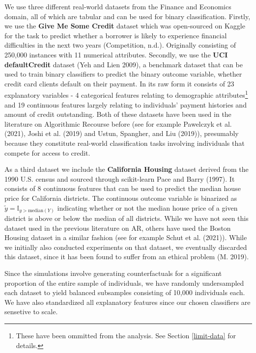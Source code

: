 \documentclass[conference,final,]{IEEEtran}
\begin{document}
We use three different real-world datasets from the Finance and Economics domain, all of which are tabular and can be used for binary classification. Firstly, we use the \textbf{Give Me Some Credit} dataset which was open-sourced on Kaggle for the task to predict whether a borrower is likely to experience financial difficulties in the next two years (Competition, n.d.). Originally consisting of 250,000 instances with 11 numerical attributes. Secondly, we use the \textbf{UCI defaultCredit} dataset (Yeh and Lien 2009), a benchmark dataset that can be used to train binary classifiers to predict the binary outcome variable, whether credit card clients default on their payment. In its raw form it consists of 23 explanatory variables - 4 categorical features relating to demographic attributes\footnote{These have been ommitted from the analysis. See Section \ref{limit-data} for details.} and 19 continuous features largely relating to individuals' payment histories and amount of credit outstanding. Both of these datasets have been used in the literature on Algorithmic Recourse before (see for example Pawelczyk et al. (2021), Joshi et al. (2019) and Ustun, Spangher, and Liu (2019)), presumably because they constitute real-world classification tasks involving individuals that compete for access to credit.

As a third dataset we include the \textbf{California Housing} dataset derived from the 1990 U.S. census and sourced through scikit-learn Pace and Barry (1997). It consists of 8 continuous features that can be used to predict the median house price for California districts. The continuous outcome variable is binarized as \(\tilde{y}=\mathbb{I}_{y>\text{median}(Y)}\) indicating whether or not the median house price of a given district is above or below the median of all districts. While we have not seen this dataset used in the previous literature on AR, others have used the Boston Housing dataset in a similar fashion (see for example Schut et al. (2021)). While we initially also conducted experiments on that dataset, we eventually discarded this dataset, since it has been found to suffer from an ethical problem (M. 2019).

Since the simulations involve generating counterfactuals for a significant proportion of the entire sample of individuals, we have randomly undersampled each dataset to yield balanced subsamples consisting of 10,000 individuals each. We have also standardized all explanatory features since our chosen classifiers are sensetive to scale.
\end{document}
